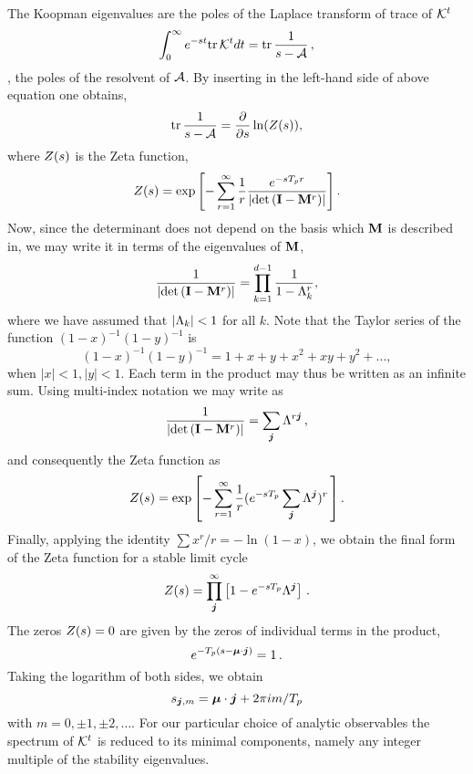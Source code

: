 The Koopman eigenvalues are the poles of the
Laplace transform of trace of ${\cal K}^t$
%
\[
\int_0^\infty e^{-st} \mbox{\rm tr}\, {\cal K}^t dt =\mbox{\rm tr}\, \frac{1}{s-{\cal A}}
\,,
\]
%
\ie, the poles of the
resolvent of ${\cal A}$. By inserting  in the
left-hand side of above equation one obtains,
%
\[
\mbox{\rm tr}\, \frac{1}{s-{\cal A}} = \frac{\partial }{\partial s} \ln (Z(s)),
\]
%
where $Z(s)$ is the Zeta function,
%
\[
Z(s) = \exp \left [-\sum_{r=1}^\infty\frac {1}{r} \frac{e^{-s{T_{p}} r}}{|\mbox{\rm det}\,({\bf\mathbf{I}}-{\bf\mathbf{M}}^r)|}
         \right ].
\]
%
Now, since the determinant does not depend on the basis which ${\bf\mathbf{M}}$
is described in, we may write it in terms of the eigenvalues of
${\bf\mathbf{M}}$,
%
\begin{equation}
\frac{1}{|\mbox{\rm det}\, ({\bf\mathbf{I}}- {\bf\mathbf{M}}^r)|} = \prod_{k=1}^{d-1} \frac{1}{1-\Lambda_k^r},
\label{eq:prod2sum}
\end{equation}
%
where we have assumed that $|\Lambda_k|<1$ for all $k$. Note that
the Taylor series of the function $(1-x)^{-1}(1-y)^{-1} $ is
%
\[
(1-x)^{-1}(1-y)^{-1} = 1+x+y+ x^2 + xy + y^2+\dots,
\]
%
when $|x|<1,|y|<1$. Each term in the product  may
thus be written as an infinite sum.
Using multi-index notation  we may write
 as
%
\[
\frac{1}{|\mbox{\rm det}\,({\bf\mathbf{I}}-{\bf\mathbf{M}}^r)|}
= \sum_{{\boldsymbol j}} \Lambda^{r{\boldsymbol j}}
\,,
\]
%
and consequently the Zeta function  as
%
\[
Z(s) = \exp \left [-\sum_{r=1}^\infty\frac {1}{r}
  (e^{-s{T_{p}}}  \sum_{{\boldsymbol j}} \Lambda^{\boldsymbol j})^{r}
             \,\right].
\]
%
Finally,  applying the identity $\sum x^r/r= -\ln(1-x)$,  we obtain
the final form of the Zeta function for a stable limit cycle
%
%
\begin{equation}
Z(s) 	= \prod_{{\boldsymbol j}}^\infty
   \left [1-e^{-s{T_{p}}} \Lambda^{\boldsymbol j}\right]
\,.
\label{eq:app:zeta2}
\end{equation}
The zeros $Z(s)=0$ are given by the zeros of individual terms in the
product, \ie
%
\[
e^{-{T_{p}}(s- {\boldsymbol \mu}\cdot{\boldsymbol j} )} = 1
\,.
\]
Taking the logarithm of both sides, we obtain
%
\begin{equation}
s_{{\boldsymbol j},m}={\boldsymbol \mu}\cdot{\boldsymbol j} + {2\pi i m}/{{T_{p}}}
\label{eq:app:tr:limit:final}
\end{equation}
%
with $m=0,\pm 1, \pm2, \dots $. For our
particular choice of analytic observables the spectrum of ${\cal K}^t$ is
reduced to its minimal components, namely any integer multiple of
the stability eigenvalues.


